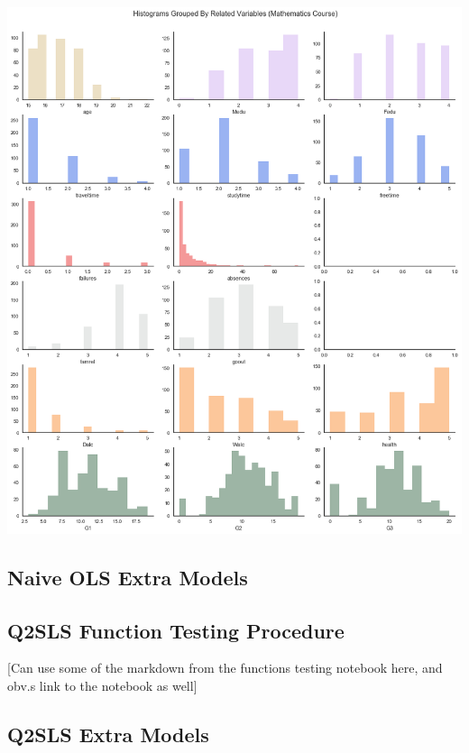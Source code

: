 \documentclass[12pt]{article}
\begin{document}
\includegraphics[scale=0.5]{figures/quantvar_hist_math.png}


\subsection{Naive OLS Extra Models}

\subsection{Q2SLS Function Testing Procedure}
\textcolor{BrickRed}{[Can use some of the markdown from the functions testing notebook here, and obv.s link to the notebook as well]}

\subsection{Q2SLS Extra Models}
\end{document}
